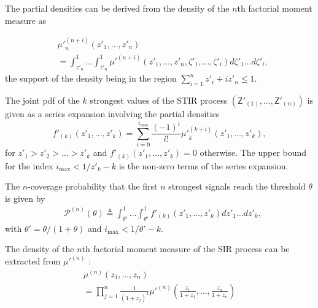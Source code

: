 \documentclass[lettersize,journal]{IEEEtran}
\begin{document}
The partial densities can be derived from the density of the $n$th factorial moment measure as \cite[Eq. 62]{7305791}

\begin{align}
  \label{eq:auxillary}
  &{\mu'}_n^{(n+i)}(z'_1,\dots,z'_n) \nonumber \\
  &= \int_{z'_n}^1 \dots \int_{z'_n}^1 {\mu'}^{(n+i)}(z'_1,\dots,z'_n,\zeta'_1,\dots,\zeta'_i) d\zeta'_1 \dots d\zeta'_i,
\end{align}
the support of the density being in the region $\sum_{i=1}^nz'_i+iz'_n \leq 1$. 


The joint pdf of the $k$ strongest values of the STIR process $(\mathsf{Z}'_{(1)}, \dots, \mathsf{Z}'_{(n)})$ is given as a series expansion involving the partial densities \cite[Eq. 64]{7305791}
\begin{equation}
  \label{eq:jointprobability}
  f'_{(k)}(z'_1,\dots,z'_k)= \sum^{i_{\text{max}}}_{i=0}\frac{(-1)^i}{i!}{\mu'}_k^{(k+i)}(z'_1,\dots,z'_k),
\end{equation}
for $z'_1>z'_2>\dots>z'_k$ and $f'_{(k)}(z'_1,\dots,z'_k) =0 $ otherwise. The upper bound for the index $i_{\text{max}}<1/z'_k-k$ is the non-zero terms of the series expansion. 

The $n$-coverage probability that the first $n$ strongest signals reach the threshold $\theta$ is given by
\begin{align}
  \label{eq:kprobability}
  &\mathcal{P}^{(n)}(\theta) \triangleq  \int_{\theta'}^1\dots \int_{\theta'}^1 f'_{(k)}({z'_1},\dots,{z'_k})dz'_1 \dots d{z'_k}, 
\end{align}
with $\theta'=\theta/(1+\theta)$ and $i_{\text{max}}<1/\theta'-k$.





    The density of the $n$th factorial moment measure of the SIR process can be extracted from $\mu'^{(n)}$ \cite[Corollary 6.1.3]{alma998193414406526}:
    \begin{align}
      \label{eq:densitySINR}
      &\mu^{(n)}(z_1,\dots,z_n)&  \nonumber\\
      &= \prod_{j=1}^n\frac{1}{(1+z_j)^2}\mu'^{(n)}\left(\frac{z_1}{1+z_1},\dots,\frac{z_n}{1+z_n}\right)
    \end{align}
\end{document}
